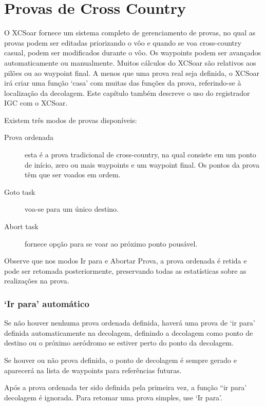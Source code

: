\chapter{Provas de Cross Country}\label{cha:tasks}

O XCSoar fornece um sistema completo de gerenciamento de provas, no qual as provas podem ser editadas priorizando o vôo e quando se voa cross-country casual, podem ser modificados durante o vôo.  Os waypoints podem ser avançados automaticamente ou manualmente.  Muitos cálculos do XCSoar são relativos aos pilões ou ao waypoint final.  A menos que uma prova real seja definida, o XCSoar irá criar uma função ‘casa’ com muitas das funções da prova, referindo-se à localização da decolagem.  Este capítulo também descreve o uso do registrador IGC com o XCSoar.

Existem três modos de provas disponíveis:

\begin{description}
\item[Prova ordenada] esta é a prova tradicional de cross-country, na qual consiste em um ponto de início, zero ou mais waypoints e um waypoint final.  Os pontos da prova têm que ser voados em ordem.
\item[Goto task] voa-se para um único destino.
\item[Abort task] fornece opção para se voar ao próximo ponto pousável.
\end{description}

Observe que nos modos Ir para e Abortar Prova, a prova ordenada é retida e pode ser retomada posteriormente, preservando todas as estatísticas sobre as realizações na prova.

\subsection*{‘Ir para’ automático}

Se não houver nenhuma prova ordenada definida, haverá uma prova de ‘ir para’ definida automaticamente na decolagem, definindo a decolagem como ponto de destino ou o próximo aeródromo se estiver perto do ponto da decolagem.

Se houver ou não prova definida, o ponto de decolagem é sempre gerado e aparecerá na lista de waypoints para referências futuras.

Após a prova ordenada ter sido definida pela primeira vez, a função “ir para’ decolagem é ignorada.  Para retomar uma prova simples, use ‘Ir para’.


